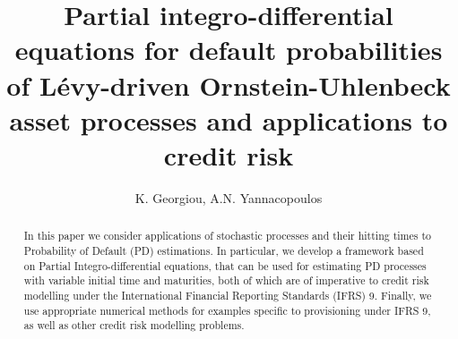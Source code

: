 \documentclass[11pt,reqno]{article}
\theoremstyle{definition}
\begin{document}
\title{Partial integro-differential equations for default probabilities of L\'evy-driven Ornstein-Uhlenbeck asset processes and applications to credit risk}
	
\author{K. Georgiou, A.N. Yannacopoulos}
\maketitle
\tableofcontents



\begin{abstract}
In this paper we consider applications of stochastic processes and their hitting times to Probability of Default (PD) estimations. In particular, we develop a framework based on Partial Integro-differential equations, that can be used for estimating PD processes with variable initial time and maturities, both of which are of imperative to credit risk modelling under the International Financial Reporting Standards (IFRS) 9. Finally, we use appropriate numerical methods for examples specific to provisioning under IFRS 9, as well as other credit risk modelling problems.
\end{abstract}
\end{document}
